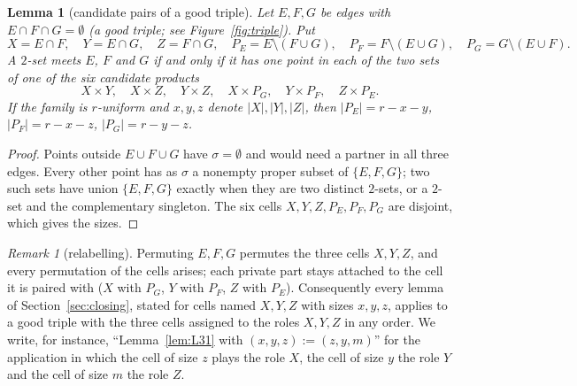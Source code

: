 \documentclass[11pt]{amsart}
\newtheorem{lemma}[theorem]{Lemma}
\theoremstyle{definition}
\theoremstyle{remark}
\newtheorem{remark}[theorem]{Remark}
\begin{document}
\begin{lemma}[candidate pairs of a good triple]\label{lem:cand3}
Let $E,F,G$ be edges with $E\cap F\cap G=\emptyset$ (a \emph{good triple}; see Figure~\ref{fig:triple}). Put
\[
X=E\cap F,\quad Y=E\cap G,\quad Z=F\cap G,\quad P_E=E\setminus(F\cup G),\quad P_F=F\setminus(E\cup G),\quad P_G=G\setminus(E\cup F).
\]
A $2$-set meets $E$, $F$ and $G$ if and only if it has one point in each of the two sets of one of the six \emph{candidate products}
\[
X\times Y,\quad X\times Z,\quad Y\times Z,\quad X\times P_G,\quad Y\times P_F,\quad Z\times P_E .
\]
If the family is $r$-uniform and $x,y,z$ denote $|X|,|Y|,|Z|$, then $|P_E|=r-x-y$, $|P_F|=r-x-z$, $|P_G|=r-y-z$.
\end{lemma}
\begin{proof}
Points outside $E\cup F\cup G$ have $\sigma=\emptyset$ and would need a partner in all three edges. Every other point has as $\sigma$ a nonempty proper subset of $\{E,F,G\}$; two such sets have union $\{E,F,G\}$ exactly when they are two distinct $2$-sets, or a $2$-set and the complementary singleton. The six cells $X,Y,Z,P_E,P_F,P_G$ are disjoint, which gives the sizes.
\end{proof}

\begin{remark}[relabelling]\label{rem:relabel}
Permuting $E,F,G$ permutes the three cells $X,Y,Z$, and every permutation of the cells arises; each private part stays attached to the cell it is paired with ($X$ with $P_G$, $Y$ with $P_F$, $Z$ with $P_E$). Consequently every lemma of Section~\ref{sec:closing}, stated for cells named $X,Y,Z$ with sizes $x,y,z$, applies to a good triple with the three cells assigned to the roles $X,Y,Z$ in any order. We write, for instance, ``Lemma~\ref{lem:L31} with $(x,y,z):=(z,y,m)$'' for the application in which the cell of size $z$ plays the role $X$, the cell of size $y$ the role $Y$ and the cell of size $m$ the role $Z$.
\end{remark}
\end{document}
